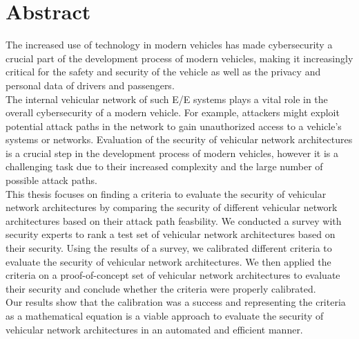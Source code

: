 
\chapter*{Abstract}\label{chp:abstract}

The increased use of technology in modern vehicles has made cybersecurity a crucial part of the development process of modern vehicles,
making it increasingly critical for the safety and security of the vehicle as well as the privacy and personal data of drivers and passengers.\\

The internal vehicular network of such E/E systems plays a vital role in the overall cybersecurity of a modern vehicle.
For example, attackers might exploit potential attack paths in the network to gain unauthorized access to a vehicle's systems or networks.
Evaluation of the security of vehicular network architectures is a crucial step in the development process of modern vehicles,
however it is a challenging task due to their increased complexity and the large number of possible attack paths.\\

This thesis focuses on finding a criteria to evaluate the security of vehicular network architectures by
comparing the security of different vehicular network architectures based on their attack path feasbility.
We conducted a survey with security experts to rank a test set of vehicular network architectures based on their security.
Using the results of a survey, we calibrated different criteria to evaluate the security of vehicular network architectures. 
We then applied the criteria on a proof-of-concept set of vehicular network architectures to evaluate their security and conclude whether the criteria were properly calibrated.\\

Our results show that the calibration was a success and representing the criteria as a mathematical equation is a 
viable approach to evaluate the security of vehicular network architectures in an automated and efficient manner.